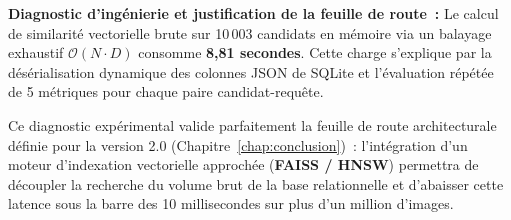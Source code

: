 \noindent\textbf{Diagnostic d'ingénierie et justification de la feuille de route~:}
Le calcul de similarité vectorielle brute sur 10\,003 candidats en mémoire via un balayage exhaustif $\mathcal{O}(N \cdot D)$ consomme \textbf{8,81 secondes}. Cette charge s'explique par la désérialisation dynamique des colonnes JSON de SQLite et l'évaluation répétée de 5 métriques pour chaque paire candidat-requête. 

Ce diagnostic expérimental valide parfaitement la feuille de route architecturale définie pour la version 2.0 (Chapitre~\ref{chap:conclusion})~: l'intégration d'un moteur d'indexation vectorielle approchée (\textbf{FAISS / HNSW}) permettra de découpler la recherche du volume brut de la base relationnelle et d'abaisser cette latence sous la barre des 10 millisecondes sur plus d'un million d'images.